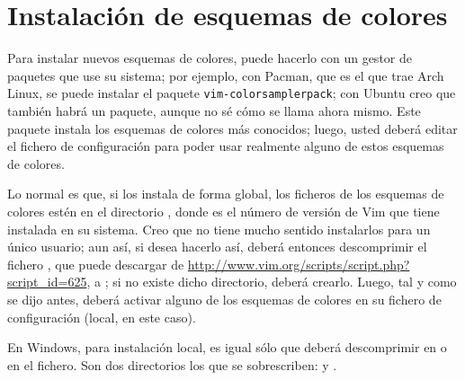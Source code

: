 \section{Instalación de esquemas de colores}\label{sec:vim-color}
Para instalar nuevos esquemas de colores, puede hacerlo con un gestor de paquetes que use su sistema; por
ejemplo, con Pacman, que es el que trae Arch Linux, se puede instalar el paquete
\lstinline!vim-colorsamplerpack!; con Ubuntu creo que también habrá un paquete, aunque no sé cómo se llama ahora
mismo. Este paquete instala los esquemas de colores más conocidos; luego, usted deberá editar el fichero de
configuración para poder usar realmente alguno de estos esquemas de colores.

Lo normal es que, si los instala de forma global, los ficheros de los esquemas de colores estén en el directorio
, donde  es el número de versión de Vim que tiene
instalada en su sistema. Creo que no tiene mucho sentido instalarlos para un único usuario; aun así, si desea
hacerlo así, deberá entonces descomprimir el fichero , que puede descargar de
\url{http://www.vim.org/scripts/script.php?script_id=625}, a ; si no
existe dicho directorio, deberá crearlo. Luego, tal y como se dijo antes, deberá activar alguno de los esquemas
de colores en su fichero de configuración (local, en este caso).

En Windows, para instalación local, es igual sólo que deberá descomprimir en  o en  el fichero. Son dos directorios los
que se sobrescriben:  y .
